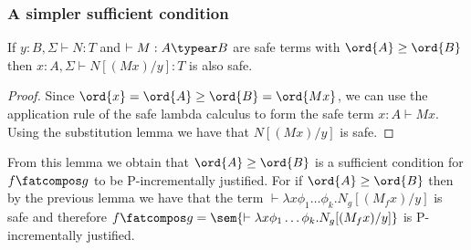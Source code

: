 \subsubsection{A simpler sufficient condition}
%
%
%
%

\begin{lemma}
If $y:B, \Sigma \vdash N : T$ and $\vdash M : A \typear B$ 
are safe terms with $\ord{A} \geq \ord{B}$
then $x:A, \Sigma \vdash N[(M x)/y] :T$ is also safe.
\end{lemma}
\begin{proof}
Since $\ord{x} = \ord{A} \geq \ord{B} = \ord{M x}$, we can use the application 
rule of the safe lambda calculus to form the safe term $x:A \vdash M x$.
Using the substitution lemma we have that $N[(M x)/y]$ is safe.
\end{proof}

From this lemma we obtain that $\ord{A}\geq\ord{B}$ is
a sufficient condition for $f\fatcompos g$ to be P-incrementally justified.
For if $\ord{A}\geq\ord{B}$ then by the previous lemma we have that the term $\vdash \lambda x \phi_1 \dots \phi_k. N_g [(M_f x) / y]$
is safe and therefore $f\fatcompos g = \sem{\vdash \lambda x \phi_1 \dots \phi_k. N_g [(M_f x) / y]}$ is P-incrementally justified.


